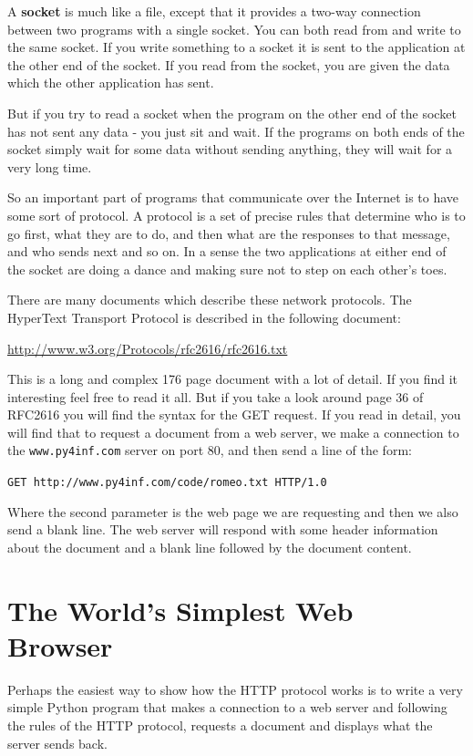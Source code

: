\documentclass[10pt]{book}
\begin{document}
A {\bf socket} is much like a file, except that it 
provides a two-way connection between two 
programs with a single socket.  
You can both read from and write to the same socket.  If you write something to 
a socket it is sent to the application at the other end of the socket.  If you 
read from the socket, you are given the data which the other application has sent.

But if you try to read a socket when the program on the other end of the socket
has not sent any data - you just sit and wait.  If the programs on both ends
of the socket simply wait for some data without sending anything, they will wait for
a very long time.

So an important part of programs that communicate over the Internet is to have some
sort of protocol.   A protocol is a set of precise rules that determine who
is to go first, what they are to do, and then what are the responses to that message,
and who sends next and so on.  In a sense the two applications at either end 
of the socket are doing a dance and making sure not to step on each other's toes.

There are many documents which describe these network protocols.  The HyperText Transport 
Protocol is described in the following document:

\url{http://www.w3.org/Protocols/rfc2616/rfc2616.txt}

This is a long and complex 176 page document with a lot of detail.  If you 
find it interesting feel free to read it all.  But if you take a look around page 36 of
RFC2616 you will find the syntax for the GET request.  If you read in detail, you will
find that to request a document from a web server, we make a connection to 
the {\tt www.py4inf.com} server on port 80, and then send a line of the form:

{\tt GET http://www.py4inf.com/code/romeo.txt HTTP/1.0 }

Where the second parameter is the web page we are requesting and then 
we also send a blank line.  The web server will respond with some 
header information about the document and a blank line
followed by the document content.

\section{The World's Simplest Web Browser}

Perhaps the easiest way to show how the HTTP protocol works is to write a very 
simple Python program that makes a connection to a web server and following
the rules of the HTTP protocol, requests a document 
and displays what the server sends back.
\end{document}
